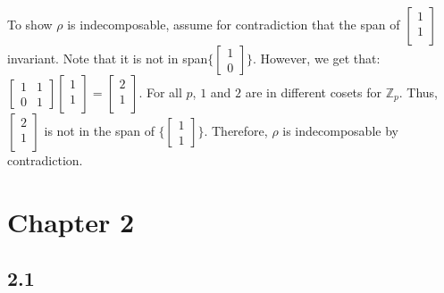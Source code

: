 \documentclass[]{article}
\begin{document}
To show $\rho$ is indecomposable, assume for contradiction that the span of $
\begin{bmatrix}
	1\\
	1\\
\end{bmatrix}$
invariant. Note that it is not in span$\lbrace \begin{bmatrix}
	1\\
	0
\end{bmatrix} \rbrace$.
However, we get that:
$
\begin{bmatrix}
	1 & 1\\
	0 & 1
\end{bmatrix}
\begin{bmatrix}
	1\\
	1\\
\end{bmatrix}
=
\begin{bmatrix}
	2\\
	1\\
\end{bmatrix}
$.
For all $p$, $1$ and $2$ are in different cosets for $\mathbb{Z}_p$. Thus, $\begin{bmatrix}
	2\\
	1\\
\end{bmatrix}$ is not in the span of $\lbrace \begin{bmatrix}
	1\\
	1
\end{bmatrix} \rbrace$. 
Therefore, $\rho$ is indecomposable by contradiction.

\section*{Chapter 2}
\subsection*{2.1}
\end{document}
